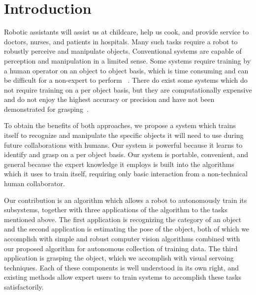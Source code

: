 \documentclass[conference]{IEEEtran}
\begin{document}

\section{Introduction}
Robotic assistants will assist us at childcare, help us cook, and provide service to
doctors, nurses, and patients in hospitals. Many such tasks require a robot to
robustly perceive and manipulate objects. 
Conventional systems are capable of perception and manipulation in a limited sense.
Some systems require training by a human operator on an object to object basis, which 
is time consuming and can be difficult for a non-expert to perform ~\citep{ork14, lai11, lai11a}. There 
do exist some systems which
do not require training on a per object basis, but they are computationally expensive and do not enjoy the
highest accuracy or precision and have not been demonstrated for grasping~\citep{guadarrama14}.

To obtain the benefits of both approaches, we propose a system which trains itself 
to recognize and manipulate the specific objects it will need to use during future
collaborations with humans. 
Our system is powerful because it learns to identify and grasp on 
a per object basis. Our system is portable, convenient, and general because the expert knowledge it employs
is built into the algorithms which it uses to train itself, requiring only basic
interaction from a non-technical human collaborator.

Our contribution is an algorithm which allows a robot to autonomously
train its subsystems, together with three applications of the
algorithm to the tasks mentioned above.  The first application is
recognizing the category of an object and the second application is
estimating the pose of the object, both of which we accomplish with
simple and robust computer vision algorithms combined with our
  proposed algorithm for autonomous collection of training data. The
third application is grasping the object, which we accomplish with
visual servoing techniques. Each of these components is well
understood in its own right, and existing methods allow expert users
to train systems to accomplish these tasks satisfactorily.
\end{document}
